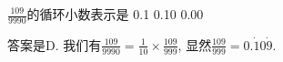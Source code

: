 \begin{prob}
\label{prob:prob-1}
$\frac{109}{9990}$的循环小数表示是
{0.1}
{0.10}
{0.00}
{}
\end{prob}

\begin{soln}
答案是$\boxed{\text{D}.}$
我们有$\frac{109}{9990} = \frac{1}{10} \times \frac{109}{999}$,
显然$\frac{109}{999} = 0.\dot{1}0\dot{9}$.
\end{soln}
